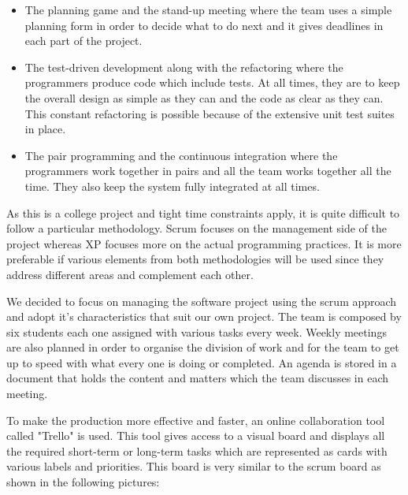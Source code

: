 \begin{itemize}
\item The planning game and the stand-up meeting where the team uses a simple planning form in order to decide what to do next and it gives deadlines in each part of the project. 
\item The test-driven development along with the refactoring where the programmers produce code which include tests. At all times, they are to keep the overall design as simple as they can and the code as clear as they can. This constant refactoring is possible because of the extensive unit test suites in place.
\item The pair programming and the continuous integration where the programmers work together in pairs and all the team works together all the time. They also keep the system fully integrated at all times. 
\end{itemize}

As this is a college project and tight time constraints apply, it is quite difficult to follow a particular methodology. Scrum focuses on the management side of the project whereas XP focuses more on the actual programming practices. It is more preferable if various elements from both methodologies will be used since they address different areas and complement each other.

We decided to focus on managing the software project using the scrum approach and adopt it's characteristics that suit our own project. The team is composed by six students each one assigned with various tasks every week. Weekly meetings are also planned in order to organise the division of work and for the team to get up to speed with what every one is doing or completed. An agenda is stored in a document that holds the content and matters which the team discusses in each meeting.

To make the production more effective and faster, an online collaboration tool called "Trello" is used. This tool gives access to a visual board and displays all the required short-term or long-term tasks which are represented as cards with various labels and priorities. This board is very similar to the scrum board as shown in the following pictures:

